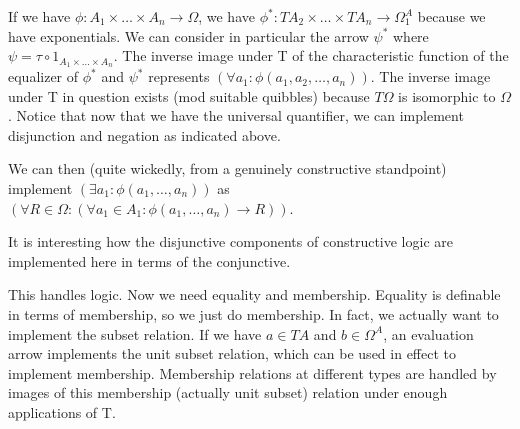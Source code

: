 \documentclass[12pt]{article}
\begin{document}
If we have $\phi:A_1\times \ldots \times A_n \rightarrow \Omega$, we have $\phi^*:TA_2 \times \ldots \times TA_n\rightarrow \Omega^A_1$ because we have exponentials.  We can consider in particular
the arrow $\psi^*$ where $\psi = \tau \circ 1_{A_1 \times \ldots \times A_n}$.  The inverse image under T of the characteristic function of the equalizer of $\phi^*$ and $\psi^*$ represents
$(\forall a_1:\phi(a_1,a_2,\ldots,a_n))$.  The inverse image under T in question exists (mod suitable quibbles) because $T\Omega$ is isomorphic to $\Omega$.  Notice that now that we have the universal quantifier, we can implement disjunction and negation as indicated above.

We can then (quite wickedly, from a genuinely constructive standpoint) implement $(\exists a_1:\phi(a_1,\ldots,a_n))$ as $(\forall R\in \Omega:(\forall a_1\in A_1:\phi(a_1,\ldots,a_n) \rightarrow R))$.

It is interesting how the disjunctive components of constructive logic are implemented here in terms of the conjunctive.

This handles logic.  Now we need equality and membership.  Equality is definable in terms of membership, so we just do membership.  In fact, we actually want to implement
the subset relation.  If we have $a \in TA$ and $b \in \Omega^A$,  an evaluation arrow implements the unit subset relation, which can be used in effect to implement membership.
Membership relations at different types are handled by images of this membership (actually unit subset) relation under enough applications of T.
\end{document}
